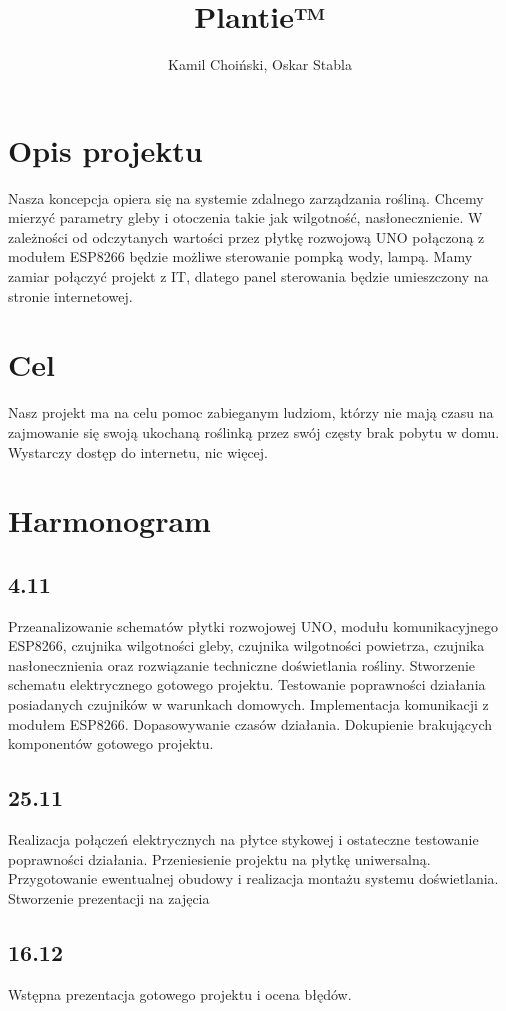 \documentclass{article}
\begin{document}
\title{Plantie™}
\author{Kamil Choiński, Oskar Stabla}
\maketitle

\section{Opis projektu}
Nasza koncepcja opiera się na systemie zdalnego zarządzania rośliną.
Chcemy mierzyć parametry gleby i otoczenia takie jak wilgotność, nasłonecznienie.
W zależności od odczytanych wartości przez płytkę rozwojową UNO połączoną z modułem ESP8266 będzie możliwe sterowanie pompką wody, lampą.
Mamy zamiar połączyć projekt z IT, dlatego panel sterowania będzie umieszczony na stronie internetowej.
\section{Cel}
Nasz projekt ma na celu pomoc zabieganym ludziom, którzy nie mają czasu na zajmowanie się swoją ukochaną roślinką przez swój częsty brak pobytu w domu. Wystarczy dostęp do internetu, nic więcej.
\section{Harmonogram}
\subsection{4.11}
Przeanalizowanie schematów płytki rozwojowej UNO, modułu komunikacyjnego ESP8266, czujnika wilgotności gleby, czujnika wilgotności powietrza, czujnika nasłonecznienia oraz rozwiązanie techniczne doświetlania rośliny. Stworzenie schematu elektrycznego gotowego projektu. Testowanie poprawności działania posiadanych czujników w warunkach domowych. Implementacja komunikacji z modułem ESP8266. Dopasowywanie czasów działania. 
Dokupienie brakujących komponentów gotowego projektu. 
\subsection{25.11}
Realizacja połączeń elektrycznych na płytce stykowej i ostateczne testowanie poprawności działania. Przeniesienie projektu na płytkę uniwersalną. Przygotowanie ewentualnej obudowy i realizacja montażu systemu doświetlania. Stworzenie prezentacji na zajęcia
\subsection{16.12}
Wstępna prezentacja gotowego projektu i ocena błędów.
\end{document}
